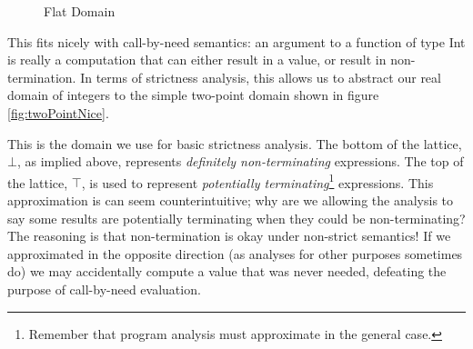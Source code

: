\begin{figure}[h]
\centering
{}
\caption{Flat Domain}
\label{fig:flatInts}
\end{figure}

This fits nicely with call-by-need semantics: an argument to a function of
type \<Int\> is really a computation that can either result in a value, or
result in non-termination. In terms of strictness analysis, this allows us to
abstract our real domain of integers to the simple two-point domain shown in
figure \ref{fig:twoPointNice}.

This is the domain we use for basic strictness analysis. The bottom of the
lattice, $\bot$, as implied above, represents \emph{definitely non-terminating}
expressions. The top of the lattice, $\top$, is used to represent
\emph{potentially terminating}\footnote{Remember that program analysis must
approximate in the general case.} expressions. This approximation is can seem
counterintuitive; why are we allowing the analysis to say some results are
potentially terminating when they could be non-terminating? The reasoning is
that non-termination is okay under non-strict semantics! If we approximated in
the opposite direction (as analyses for other purposes sometimes do) we may
accidentally compute a value that was never needed, defeating the purpose of
call-by-need evaluation.


